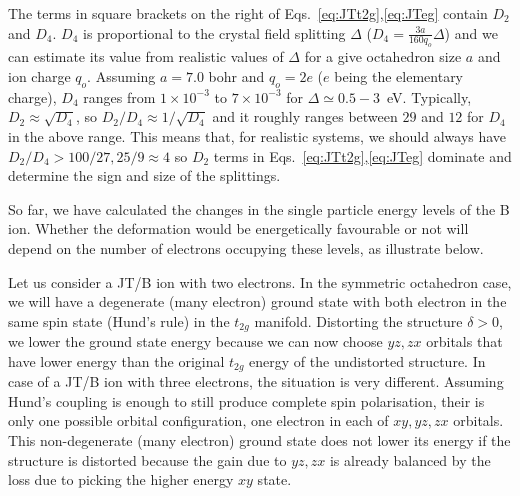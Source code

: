 \documentclass[a4paper,prb,twocolumn]{revtex4-1}  %
\begin{document}
The terms in square brackets on the right of Eqs.~\ref{eq:JTt2g},\ref{eq:JTeg}
contain $D_2$ and $D_4$. 
$D_4$ is proportional to the crystal field splitting $\Delta$ 
($D_4=\frac{3a}{160q_o} \Delta$) and 
we can estimate its value from realistic values of $\Delta$ for a give octahedron size $a$ and ion charge $q_o$. 
Assuming $a=7.0$ bohr and $q_o=2e$ ($e$ being the elementary charge),
$D_4$ ranges from $1 \times 10^{-3}$ to  $7 \times 10^{-3}$
for $\Delta \simeq 0.5-3$~eV.
Typically, ${D_{2}\approx \sqrt{D_{4}}}$,
so $D_{2}/D_{4} \approx 1/\sqrt{D_{4}}$
and it roughly ranges between $29$ and $12$ for $D_4$ in the above range.
This means that, for realistic systems, 
we should always have $D_{2}/D_{4} > 100/27, 25/9 \approx 4$
so 
$D_{2}$ terms in 
Eqs.~\ref{eq:JTt2g},\ref{eq:JTeg}
dominate and determine the sign and size of the splittings.


So far, we have calculated the changes in the single particle energy levels of the B ion. 
Whether the deformation would be energetically favourable 
or not will depend on the number of electrons occupying these levels,
as illustrate below.


Let us consider %
a JT/B ion with two electrons.
In the symmetric octahedron case, 
we will have a degenerate (many electron) ground state 
with both electron in the same spin state (Hund's rule) in the $t_{2g}$ manifold.
Distorting the structure $\delta>0$, we lower the ground state energy because 
we can now choose $yz,zx$ orbitals that have lower energy than the original $t_{2g}$ energy of the undistorted structure.
In case of a JT/B ion with three electrons, the situation is very different.
Assuming Hund's coupling is enough to still produce complete spin polarisation,
their is only one possible orbital configuration, one electron in each of $xy,yz,zx$ orbitals.
This non-degenerate (many electron) ground state
does not lower its energy if the structure is distorted 
because the gain due to $yz,zx$ is already balanced by the loss due to picking the higher energy $xy$ state.
\end{document}
